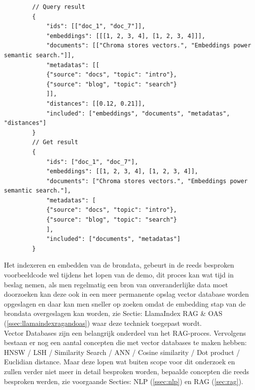 \begin{listing}
    \begin{verbatim}
        // Query result
        {
            "ids": [["doc_1", "doc_7"]],
            "embeddings": [[[1, 2, 3, 4], [1, 2, 3, 4]]],
            "documents": [["Chroma stores vectors.", "Embeddings power semantic search."]],
            "metadatas": [[
            {"source": "docs", "topic": "intro"},
            {"source": "blog", "topic": "search"}
            ]],
            "distances": [[0.12, 0.21]],
            "included": ["embeddings", "documents", "metadatas", "distances"]
        }
        // Get result
        {
            "ids": ["doc_1", "doc_7"],
            "embeddings": [[1, 2, 3, 4], [1, 2, 3, 4]],
            "documents": ["Chroma stores vectors.", "Embeddings power semantic search."],
            "metadatas": [
            {"source": "docs", "topic": "intro"},
            {"source": "blog", "topic": "search"}
            ],
            "included": ["documents", "metadatas"]
        }
    \end{verbatim}
    \caption[Resultaat van een query op vector-store ChromaDB]{Voorbeeld resultaat van een query op ChromaDB, uit de chroma documentatie: \footnote{\href{https://docs.trychroma.com/docs/querying-collections/query-and-get}{https://docs.trychroma.com/docs/querying-collections/query-and-get}}}
    \label{lst:chromadbqueryresult}
\end{listing}

Het indexeren en embedden van de brondata, gebeurt in de reeds besproken voorbeeldcode wel tijdens het lopen van de demo, dit proces kan wat tijd in beslag nemen, als men regelmatig een bron van onveranderlijke data moet doorzoeken kan deze ook in een meer permanente opslag vector database worden opgeslagen en daar kan men sneller op zoeken omdat de embedding stap van de brondata overgeslagen kan worden, zie Sectie: LlamaIndex RAG \& OAS  (\ref{ssec:llamaindexragandoas}) waar deze techniek toegepast wordt. \\

Vector Databases zijn een belangrijk onderdeel van het RAG-proces. Vervolgens bestaan er nog een aantal concepten die met vector databases te maken hebben: HNSW / LSH / Similarity Search / ANN / Cosine similarity / Dot product / Euclidian distance.
Maar deze lopen wat buiten scope voor dit onderzoek en zullen verder niet meer in detail besproken worden, bepaalde concepten die reeds besproken werden, zie voorgaande Secties: NLP (\ref{ssec:nlp}) en RAG (\ref{sec:rag}). \\

